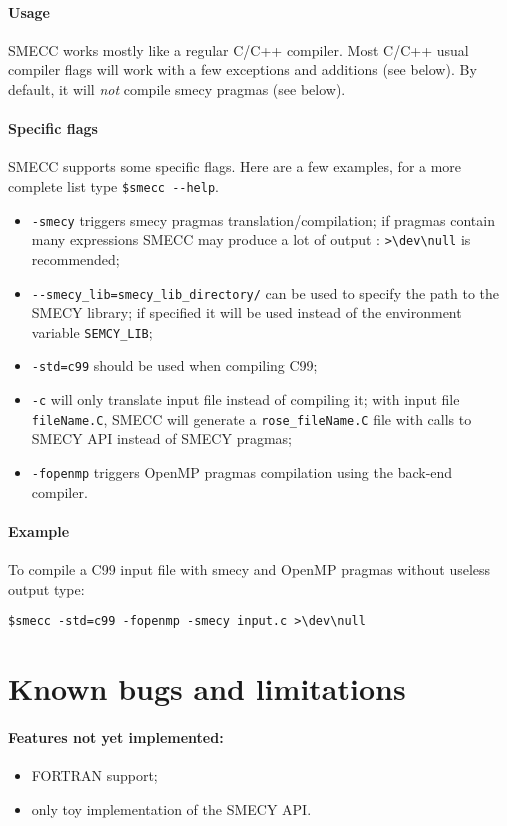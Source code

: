 \documentclass[A4]{article}
\newcommand{\scompiler}{SMECC }
\begin{document}
		\paragraph{Usage}
		\scompiler works mostly like a regular C/C++ compiler. Most C/C++ usual compiler flags will work with a few exceptions and additions (see below). By default, it will \emph{not} compile smecy pragmas (see below).
		
		\paragraph{Specific flags}
		\scompiler supports some specific flags. Here are a few examples, for a more complete list type \verb+$smecc --help+.
		\begin{itemize}
			\item \verb+-smecy+ triggers smecy pragmas translation/compilation; if pragmas contain many expressions \scompiler may produce a lot of output : \verb+>\dev\null+ is recommended;
			\item \verb+--smecy_lib=smecy_lib_directory/+ can be used to specify the path to the SMECY library; if specified it will be used instead of the environment variable \verb+SEMCY_LIB+;
			\item \verb+-std=c99+ should be used when compiling C99;
			\item \verb+-c+ will only translate input file instead of compiling it; with input file \verb+fileName.C+, \scompiler will generate a \verb+rose_fileName.C+ file with calls to SMECY API instead of SMECY pragmas;
			\item \verb+-fopenmp+ triggers OpenMP pragmas compilation using the back-end compiler.
		\end{itemize}
		
		\paragraph{Example} To compile a C99 input file with smecy and OpenMP pragmas without useless output type:
		\begin{verbatim}$smecc -std=c99 -fopenmp -smecy input.c >\dev\null\end{verbatim}
	
	\section{Known bugs and limitations}
	
		\paragraph{Features not yet implemented:}
		\begin{itemize}
			\item FORTRAN support;
			\item only toy implementation of the SMECY API.
		\end{itemize}
		
\end{document}
